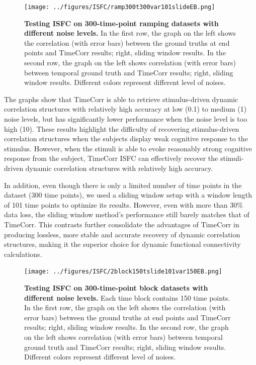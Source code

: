\documentclass[11pt]{article}
\begin{document}
\begin{figure}[!htb]
\texttt{[image: ../figures/ISFC/ramp300t300var101slideEB.png]}
\caption{\textbf{Testing ISFC on 300-time-point ramping datasets with different noise levels.} In the first row, the graph on the left shows the correlation (with error bars) between the ground truths at end points and TimeCorr results; right, sliding window results. In the second row, the graph on the left shows correlation (with error bars) between temporal ground truth and TimeCorr results; right, sliding window results. Different colors represent different level of noises.}
\label{fig:t300slide25var1000}
\end{figure}

The graphs show that TimeCorr is able to retrieve stimulus-driven dynamic correlation structures with relatively high accuracy at low (0.1) to medium (1) noise levels, but has significantly lower performance when the noise level is too high (10). These results highlight the difficulty of recovering stimulus-driven correlation structures when the subjects display weak cognitive response to the stimulus. However, when the stimuli is able to evoke reasonably strong cognitive response from the subject, TimeCorr ISFC can effectively recover the stimuli-driven dynamic correlation structures with relatively high accuracy.

In addition, even though there is only a limited number of time points in the dataset (300 time points), we used a sliding window setup with a window length of 101 time points to optimize its results. However, even with more than $30\%$ data loss, the sliding window method's performance still barely matches that of TimeCorr. This contrasts further consolidate the advantages of TimeCorr in producing lossless, more stable and accurate recovery of dynamic correlation structures, making it the superior choice for dynamic functional connectivity calculations.

\begin{figure}
\texttt{[image: ../figures/ISFC/2block150tslide101var150EB.png]}
\caption{\textbf{Testing ISFC on 300-time-point block datasets with different noise levels.} Each time block contains 150 time points. In the first row, the graph on the left shows the correlation (with error bars) between the ground truths at end points and TimeCorr results; right, sliding window results. In the second row, the graph on the left shows correlation (with error bars) between temporal ground truth and TimeCorr results; right, sliding window results. Different colors represent different level of noises.}
\label{fig:2block150tslide101var150EB}
\end{figure}
\end{document}
